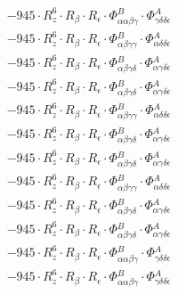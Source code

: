 \documentclass{article}
\begin{document}
\begin{subequations}
\begin{gather}
\begin{array}{c}
 \\[0.2em] 		 - 945 \cdot R_{z}^{6} \cdot R_{\beta{}} \cdot R_{\epsilon{}} \cdot \Phi{}^{B}_{\alpha{}\alpha{}\beta{}\gamma{}} \cdot \Phi{}^{A}_{\gamma{}\delta{}\delta{}\epsilon{}} 
 \\[0.2em] 		 - 945 \cdot R_{z}^{6} \cdot R_{\beta{}} \cdot R_{\epsilon{}} \cdot \Phi{}^{B}_{\alpha{}\beta{}\gamma{}\gamma{}} \cdot \Phi{}^{A}_{\alpha{}\delta{}\delta{}\epsilon{}} 
 \\[0.2em] 		 - 945 \cdot R_{z}^{6} \cdot R_{\beta{}} \cdot R_{\epsilon{}} \cdot \Phi{}^{B}_{\alpha{}\beta{}\gamma{}\delta{}} \cdot \Phi{}^{A}_{\alpha{}\gamma{}\delta{}\epsilon{}} 
 \\[0.2em] 		 - 945 \cdot R_{z}^{6} \cdot R_{\beta{}} \cdot R_{\epsilon{}} \cdot \Phi{}^{B}_{\alpha{}\beta{}\gamma{}\delta{}} \cdot \Phi{}^{A}_{\alpha{}\gamma{}\delta{}\epsilon{}} 
 \\[0.2em] 		 - 945 \cdot R_{z}^{6} \cdot R_{\beta{}} \cdot R_{\epsilon{}} \cdot \Phi{}^{B}_{\alpha{}\beta{}\gamma{}\gamma{}} \cdot \Phi{}^{A}_{\alpha{}\delta{}\delta{}\epsilon{}} 
 \\[0.2em] 		 - 945 \cdot R_{z}^{6} \cdot R_{\beta{}} \cdot R_{\epsilon{}} \cdot \Phi{}^{B}_{\alpha{}\beta{}\gamma{}\delta{}} \cdot \Phi{}^{A}_{\alpha{}\gamma{}\delta{}\epsilon{}} 
 \\[0.2em] 		 - 945 \cdot R_{z}^{6} \cdot R_{\beta{}} \cdot R_{\epsilon{}} \cdot \Phi{}^{B}_{\alpha{}\beta{}\gamma{}\delta{}} \cdot \Phi{}^{A}_{\alpha{}\gamma{}\delta{}\epsilon{}} 
 \\[0.2em] 		 - 945 \cdot R_{z}^{6} \cdot R_{\beta{}} \cdot R_{\epsilon{}} \cdot \Phi{}^{B}_{\alpha{}\beta{}\gamma{}\gamma{}} \cdot \Phi{}^{A}_{\alpha{}\delta{}\delta{}\epsilon{}} 
 \\[0.2em] 		 - 945 \cdot R_{z}^{6} \cdot R_{\beta{}} \cdot R_{\epsilon{}} \cdot \Phi{}^{B}_{\alpha{}\beta{}\gamma{}\delta{}} \cdot \Phi{}^{A}_{\alpha{}\gamma{}\delta{}\epsilon{}} 
 \\[0.2em] 		 - 945 \cdot R_{z}^{6} \cdot R_{\beta{}} \cdot R_{\epsilon{}} \cdot \Phi{}^{B}_{\alpha{}\beta{}\gamma{}\delta{}} \cdot \Phi{}^{A}_{\alpha{}\gamma{}\delta{}\epsilon{}} 
 \\[0.2em] 		 - 945 \cdot R_{z}^{6} \cdot R_{\beta{}} \cdot R_{\epsilon{}} \cdot \Phi{}^{B}_{\alpha{}\alpha{}\beta{}\gamma{}} \cdot \Phi{}^{A}_{\gamma{}\delta{}\delta{}\epsilon{}} 
 \\[0.2em] 		 - 945 \cdot R_{z}^{6} \cdot R_{\beta{}} \cdot R_{\epsilon{}} \cdot \Phi{}^{B}_{\alpha{}\alpha{}\beta{}\gamma{}} \cdot \Phi{}^{A}_{\gamma{}\delta{}\delta{}\epsilon{}} 

\end{array}
\end{gather}
\end{subequations}
\end{document}
